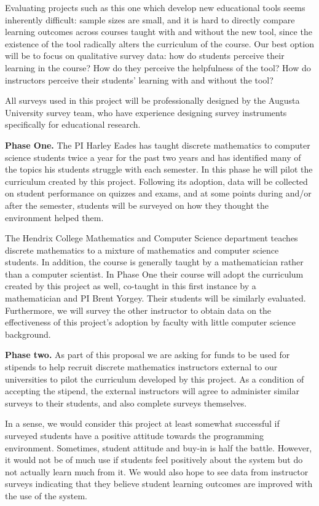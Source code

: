 Evaluating projects such as this one which develop new educational
tools seems inherently difficult: sample sizes are small, and it is
hard to directly compare learning outcomes across courses taught with
and without the new tool, since the existence of the tool radically
alters the curriculum of the course.  Our best option will be to focus
on qualitative survey data: how do students perceive their learning in
the course?  How do they perceive the helpfulness of the tool?  How do
instructors perceive their students' learning with and without the
tool?

All surveys used in this project will be professionally designed by
the Augusta University survey team, who have experience designing
survey instruments specifically for educational research.

\textbf{Phase One.} The PI Harley Eades has taught discrete
mathematics to computer science students twice a year for the past two
years and has identified many of the topics his students struggle with
each semester.  In this phase he will pilot the curriculum created by
this project.  Following its adoption, data will be collected on
student performance on quizzes and exams, and at some points during
and/or after the semester, students will be surveyed on how they
thought the \thelang{} environment helped them.

The Hendrix College Mathematics and Computer Science department
teaches discrete mathematics to a mixture of mathematics and computer
science students.  In addition, the course is generally taught by a
mathematician rather than a computer scientist.  In Phase One their
course will adopt the curriculum created by this project as well,
co-taught in this first instance by a mathematician and PI Brent
Yorgey.  Their students will be similarly evaluated.  Furthermore, we
will survey the other instructor to obtain data on the effectiveness
of this project's adoption by faculty with little computer science
background.

\textbf{Phase two.} As part of this proposal we are asking for funds
to be used for stipends to help recruit discrete mathematics
instructors external to our universities to pilot the curriculum
developed by this project. As a condition of accepting the stipend,
the external instructors will agree to administer similar surveys to
their students, and also complete surveys themselves.

In a sense, we would consider this project at least somewhat
successful if surveyed students have a positive attitude towards the
programming environment.  Sometimes, student attitude and buy-in is
half the battle.  However, it would not be of much use if students
feel positively about the system but do not actually learn much from
it.  We would also hope to see data from instructor surveys indicating
that they believe student learning outcomes are improved with the use
of the system.


